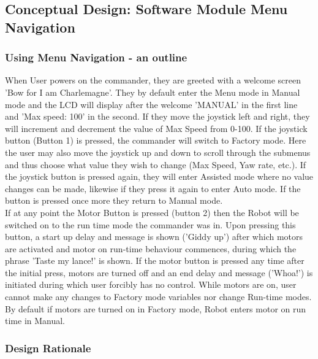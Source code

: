 \documentclass{article}
\begin{document}
	\subsection{Conceptual Design: Software Module Menu Navigation}

	
	\subsubsection{Using Menu Navigation - an outline}
	When User powers on the commander, they are greeted with a welcome screen 'Bow for I am Charlemagne'. They by default enter the Menu mode in Manual mode and the LCD will display after the welcome 'MANUAL' in the first line and 'Max speed: 100' in the second. If they move the joystick left and right, they will increment and decrement the value of Max Speed from 0-100. If the joystick button (Button 1) is pressed, the commander will switch to Factory mode. Here the user may also move the joystick up and down to scroll through the submenus and thus choose what value they wish to change (Max Speed, Yaw rate, etc.). If the joystick button is pressed again, they will enter Assisted mode where no value changes can be made, likewise if they press it again to enter Auto mode. If the button is pressed once more they return to Manual mode.\\
	
	If at any point the Motor Button is pressed (button 2) then the Robot will be switched on to the run time mode the commander was in. Upon pressing this button, a start up delay and message is shown ('Giddy up') after which motors are activated and motor on run-time behaviour commences, during which the phrase 'Taste my lance!' is shown. If the motor button is pressed any time after the initial press, motors are turned off and an end delay and message ('Whoa!') is initiated during which user forcibly has no control. While motors are on, user cannot make any changes to Factory mode variables nor change Run-time modes. By default if motors are turned on in Factory mode, Robot enters motor on run time in Manual.
	
	
	\subsubsection{Design Rationale}
\end{document}
